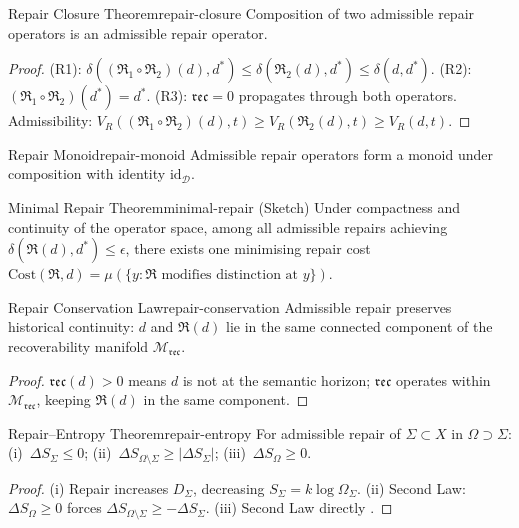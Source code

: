 \documentclass[12pt,twoside,openright]{book}
\newcommand{\repair}{\mathfrak{R}}
\newcommand{\reco}{\mathfrak{rec}}
\begin{document}
\begin{theorem}{Repair Closure Theorem}{repair-closure}
  Composition of two admissible repair operators is an
  admissible repair operator.
\end{theorem}
\begin{proof}
  (R1): $\delta((\repair_1\circ\repair_2)(d),d^*)
  \le\delta(\repair_2(d),d^*)\le\delta(d,d^*)$.
  (R2): $(\repair_1\circ\repair_2)(d^*)=d^*$.
  (R3): $\reco=0$ propagates through both operators.
  Admissibility: $V_R((\repair_1\circ\repair_2)(d),t)
  \ge V_R(\repair_2(d),t)\ge V_R(d,t)$.
\end{proof}

\begin{corollary}{Repair Monoid}{repair-monoid}
  Admissible repair operators form a monoid under
  composition with identity $\mathrm{id}_\mathcal{D}$.
\end{corollary}

\begin{theorem}{Minimal Repair Theorem}{minimal-repair}
  \textup{(Sketch)} Under compactness and continuity of
  the operator space, among all admissible repairs
  achieving $\delta(\repair(d),d^*)\le\epsilon$,
  there exists one minimising repair cost
  $\mathrm{Cost}(\repair,d)=
  \mu(\{y:\repair\text{ modifies distinction at }y\})$.
\end{theorem}

\begin{theorem}{Repair Conservation Law}{repair-conservation}
  Admissible repair preserves historical continuity:
  $d$ and $\repair(d)$ lie in the same connected
  component of the recoverability manifold $\mathcal{M}_\reco$.
\end{theorem}
\begin{proof}
  $\reco(d)>0$ means $d$ is not at the semantic horizon;
  $\mathfrak{rec}$ operates within $\mathcal{M}_\reco$,
  keeping $\repair(d)$ in the same component.
\end{proof}

\begin{theorem}{Repair--Entropy Theorem}{repair-entropy}
  For admissible repair of $\Sigma\subset X$ in
  $\Omega\supset\Sigma$:
  (i)~$\Delta S_\Sigma\le0$;
  (ii)~$\Delta S_{\Omega\setminus\Sigma}\ge|\Delta S_\Sigma|$;
  (iii)~$\Delta S_\Omega\ge0$.
\end{theorem}
\begin{proof}
  (i) Repair increases $D_\Sigma$, decreasing
  $S_\Sigma=k\log\Omega_\Sigma$.
  (ii) Second Law: $\Delta S_\Omega\ge0$ forces
  $\Delta S_{\Omega\setminus\Sigma}\ge-\Delta S_\Sigma$.
  (iii) Second Law directly \parencite{landauer1961irreversibility,
  bennett1982}.
\end{proof}
\end{document}
